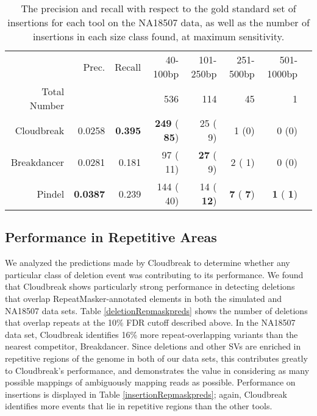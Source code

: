 \documentclass[11pt]{article}
\begin{document}
\begin{table}[t]
\begin{center}
\begin{tabular}{rrr|rrrrr}
  \hline
 & Prec. & Recall & 40-100bp & 101-250bp & 251-500bp & 501-1000bp \\ 
Total Number & & & 536 & 114 & 45 & 1 \\
  \hline
Cloudbreak & 0.0258 & \textbf{0.395} & \textbf{ 249} (\textbf{  85})  &   25 (   9) &     1 (0) & 0 (0) \\ 
Breakdancer & 0.0281 & 0.181 &   97 (  11)  & \textbf{  27} (   9) &     2 (   1) & 0 (0) \\  
  Pindel & \textbf{0.0387} & 0.239 &  144 (  40)  &   14 (\textbf{  12}) &  \textbf{   7} (\textbf{   7}) & \textbf{   1} (\textbf{   1})  \\ 
   \hline
\end{tabular}
\end{center}
\caption{The precision and recall with respect to the gold standard set of insertions for each tool on the NA18507 data, as well as the number of insertions in each size class found, at maximum sensitivity.}
\label{NA18507InsertionPreds}
\end{table}

\subsection{Performance in Repetitive Areas}

We analyzed the predictions made by Cloudbreak to determine whether any particular class of deletion event was contributing to its performance. We found that Cloudbreak shows particularly strong performance in detecting deletions that overlap RepeatMasker-annotated elements in both the simulated and NA18507 data sets. Table \ref{deletionRepmaskpreds} shows the number of deletions that overlap repeats at the 10\% FDR cutoff described above. In the NA18507 data set, Cloudbreak identifies 16\% more repeat-overlapping variants than the nearest competitor, Breakdancer. Since deletions and other SVs are enriched in repetitive regions of the genome in both of our data sets, this contributes greatly to Cloudbreak's performance, and demonstrates the value in considering as many possible mappings of ambiguously mapping reads as possible. Performance on insertions is displayed in Table \ref{insertionRepmaskpreds}; again, Cloudbreak identifies more events that lie in repetitive regions than the other tools.
\end{document}
